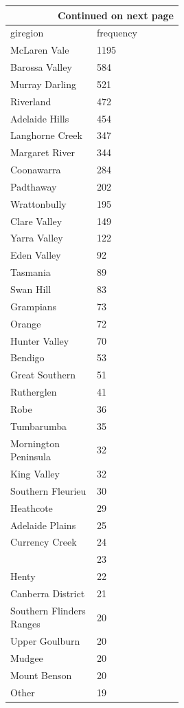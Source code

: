 \documentclass[review,12pt,authoryear]{elsarticle}
\begin{document}
\begin{linenumbers}
\begin{center}
\begin{longtable}{p{0.5\linewidth} p{.35\linewidth}}
  \hline \multicolumn{2}{|r|}{{Continued on next page}} \\ \hline
  \endfoot
  
  \hline \hline
  \endlastfoot

  giregion & frequency \\
  McLaren Vale & 1195 \\
  Barossa Valley & 584 \\
  Murray Darling & 521 \\
  Riverland & 472 \\
  Adelaide Hills & 454 \\
  Langhorne Creek & 347 \\
  Margaret River & 344 \\
  Coonawarra & 284 \\
  Padthaway & 202 \\
  Wrattonbully & 195 \\
  Clare Valley & 149 \\
  Yarra Valley & 122 \\
  Eden Valley & 92 \\
  Tasmania & 89 \\
  Swan Hill & 83 \\
  Grampians & 73 \\
  Orange & 72 \\
  Hunter Valley & 70 \\
  Bendigo & 53 \\
  Great Southern & 51 \\
  Rutherglen & 41 \\
  Robe & 36 \\
  Tumbarumba & 35 \\
  Mornington Peninsula & 32 \\
  King Valley & 32 \\
  Southern Fleurieu & 30 \\
  Heathcote & 29 \\
  Adelaide Plains & 25 \\
  Currency Creek & 24 \\
   & 23 \\
  Henty & 22 \\
  Canberra District & 21 \\
  Southern Flinders Ranges & 20 \\
  Upper Goulburn & 20 \\
  Mudgee & 20 \\
  Mount Benson & 20 \\
  Other & 19 \\

\end{longtable}
\end{center}
\end{linenumbers}
\end{document}
